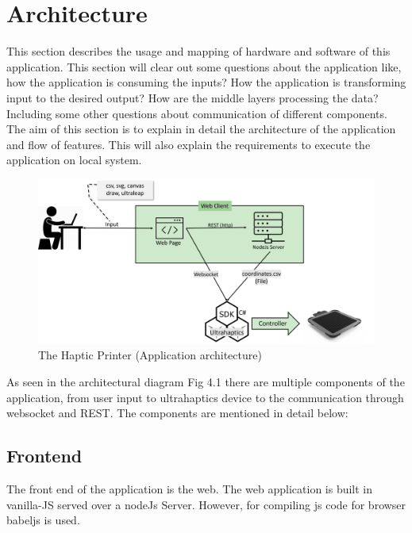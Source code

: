 %
\chapter{Architecture}
\label{sec:architecture}


This section describes the usage and mapping of hardware and software of this application. This section 
will clear out some questions about the application like, how the application
is consuming the inputs? How the application is transforming input to the desired output? 
How are the middle layers processing the data? Including some other questions about communication of different components.
The aim of this section is to explain in detail the architecture of the application and flow of features. This will also 
explain the requirements to execute the application on local system.

\begin{figure}[htb]
	\includegraphics[width=\textwidth]{gfx/Ultrahaptics-custom-architecture}
	\caption{The Haptic Printer (Application architecture)}
	\label{fig:architecture:overall architecture}
\end{figure}


As seen in the architectural diagram Fig 4.1 there are multiple components of
 the application, from user 
input to ultrahaptics device to the communication through websocket and REST. 
The components are mentioned in detail below:\\

\section{Frontend}
The front end of the application is the web. The web application is built in 
vanilla-JS served over a nodeJs Server. However, for compiling 
js code for browser babeljs\cite{babel7.15} is used.

